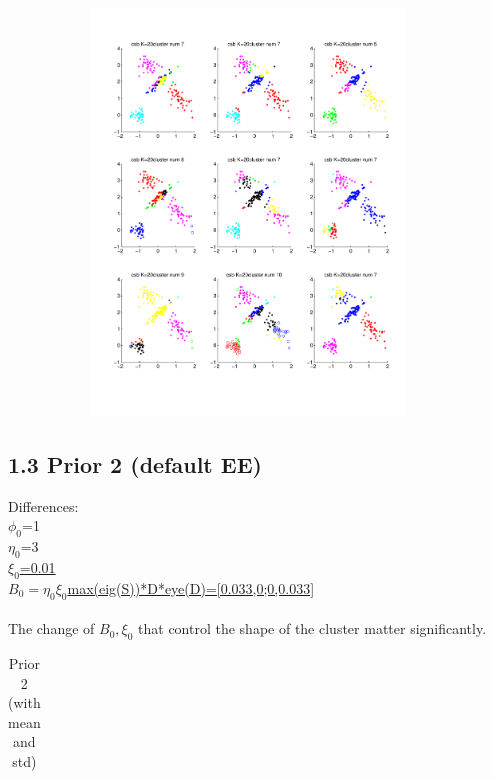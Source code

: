 \documentclass{article}
\begin{document}
\begin{spacing}{1.1}
\begin{center}
\includegraphics[width=5in,height=4.25in]{0_cee_20.pdf} \\
\end{center}


\subsection{1.3 Prior 2 (default EE)}
Differences:\\
$\phi_{0}$=1\\
$\eta_{0}$=3\\
\underline{$\xi_{0}$=0.01}\\
\underline{$B_{0}=\eta_{0}\xi_{0}$max(eig(S))*D*eye(D)=[0.033,0;0,0.033]} \\
\\The change of $B_{0},\xi_{0}$ that control the shape of the cluster matter significantly.

\begin{table}[t]
\caption{Prior 2 (with mean and std)}
\begin{center}
\begin{tabular}{|l|l|l|l|}


\end{tabular}
\end{center}
\end{table}
\end{spacing}
\end{document}
